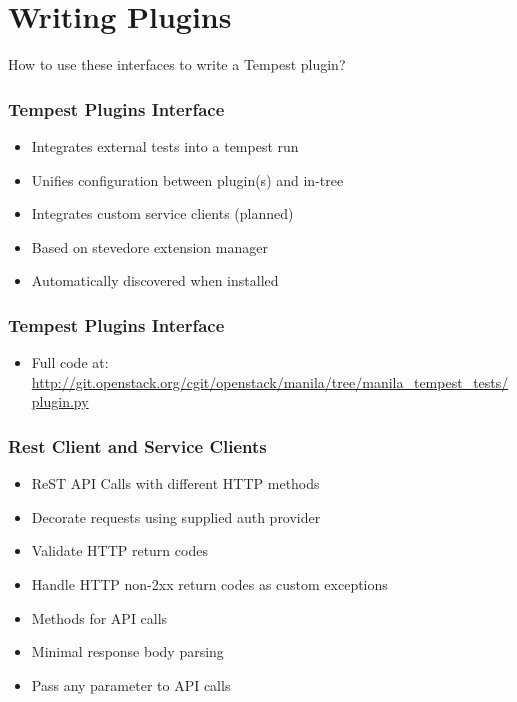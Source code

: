 \documentclass[aspectratio=169,11pt,hyperref={colorlinks=true}]{beamer}
\begin{document}
\section{Writing Plugins}
\begin{frame}[c]
    \begin{center}
        \large How to use these interfaces to write a Tempest plugin?
    \end{center}
\end{frame}

\begin{frame}
    \frametitle{Tempest Plugins Interface}
    \begin{itemize}
        \item Integrates external tests into a tempest run
        \item Unifies configuration between plugin(s) and in-tree
        \item Integrates custom service clients (planned)
    \end{itemize}
    \begin{itemize}
    	\item{Based on stevedore extension manager}
    	\item{Automatically discovered when installed}
    \end{itemize}
\end{frame}

\begin{frame}
    \frametitle{Tempest Plugins Interface}
    
    \begin{itemize}
        \item \tiny Full code at: \href{http://git.openstack.org/cgit/openstack/manila/tree/manila_tempest_tests/plugin.py}{http://git.openstack.org/cgit/openstack/manila/tree/manila\_tempest\_tests/plugin.py}
    \end{itemize}
\end{frame}

\begin{frame}
    \frametitle{Rest Client and Service Clients}
    \begin{itemize}
        \item ReST API Calls with different HTTP methods
        \item Decorate requests using supplied auth provider
        \item Validate HTTP return codes
        \item Handle HTTP non-2xx return codes as custom exceptions
    \end{itemize}
    \begin{itemize}
        \item Methods for API calls
        \item Minimal response body parsing
        \item Pass any parameter to API calls
    \end{itemize}
\end{frame}
\end{document}

